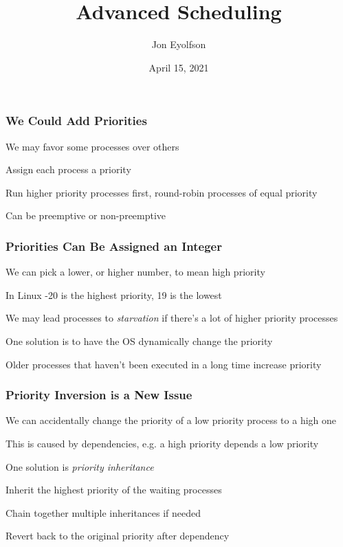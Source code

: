 

\title{Advanced Scheduling}
\author{Jon Eyolfson}
\date{April 15, 2021}


  \begin{frame}
    \titlepage
  \end{frame}

  \begin{frame}
    \frametitle{We Could Add Priorities}

    We may favor some processes over others

    \hspace{2em} Assign each process a priority

    \vspace{2em}

    Run higher priority processes first, round-robin processes of equal priority

    \hspace{2em} Can be preemptive or non-preemptive
  \end{frame}

  \begin{frame}
    \frametitle{Priorities Can Be Assigned an Integer}
    
    We can pick a lower, or higher number, to mean high priority

    \hspace{2em} In Linux -20 is the highest priority, 19 is the lowest

    \vspace{2em}

    We may lead processes to \textit{starvation} if there's a lot of higher
    priority processes

    \vspace{2em}

    One solution is to have the OS dynamically change the priority

    \hspace{2em} Older processes that haven't been executed in a long time increase priority
  \end{frame}

  \begin{frame}
    \frametitle{Priority Inversion is a New Issue}

    We can accidentally change the priority of a low priority process to a high one

    \hspace{2em} This is caused by dependencies, e.g. a high priority depends a low priority

    \vspace{2em}

    One solution is \textit{priority inheritance}

    \hspace{2em} Inherit the highest priority of the waiting processes

    \hspace{2em} Chain together multiple inheritances if needed

    \hspace{2em} Revert back to the original priority after dependency
  \end{frame}

